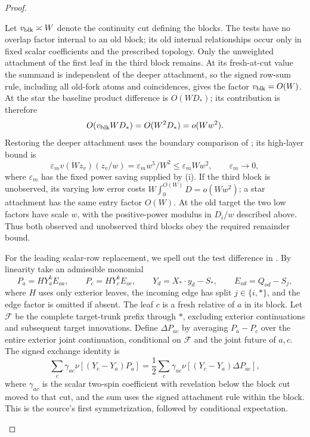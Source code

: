 \begin{proof}
\begin{enumerate}[label=(\roman*)]
Let \(v_{\rm blk}\asymp W\) denote the continuity cut defining the
blocks. The tests have no overlap factor internal to an old block;
its old internal relationships occur only in fixed scalar coefficients
and the prescribed topology.
Only the unweighted attachment of the first leaf in the third
block remains. At its fresh-at-cut value the summand is independent of
the deeper attachment, so the signed row-sum rule, including all old-fork atoms and coincidences,
gives the factor
\(v_{\rm blk}=O(W)\). At the star the baseline product difference
is \(O(WD_*)\); its contribution is therefore
\[
 O(v_{\rm blk}WD_*)=O(W^2D_*)=o(Ww^2).
\]
Restoring the deeper attachment uses the boundary comparison of
\cite[Lemma~4.5]{PE}; its high-layer bound is
\[
 \varepsilon_m v(Wz_v)(z_v/w)
 =\varepsilon_m w^5/W^2\le\varepsilon_m Ww^2,
 \qquad \varepsilon_m\to0,
\]
where \(\varepsilon_m\) has the fixed power saving supplied by (i). If the third block is unobserved,
its varying low error costs \(W\int_0^{O(W)}D=o(Ww^2)\);
a star attachment has the same entry factor \(O(W)\).
At the old target the two low factors have scale \(w\), with the
positive-power modulus in \(D_i/w\) described above. Thus both
observed and unobserved third blocks obey the required remainder bound.


For the leading scalar-row replacement, we spell out the test
difference in \cite[Lemma~4.8, proof of the first replacement]{PE}.
By linearity take an admissible monomial
\[
 P_a=H Y_a^k E_{oa},\qquad P_c=H Y_c^k E_{oc},\qquad
 Y_d=X_*\cdot y_d-S_*,\qquad E_{od}=Q_{od}-S_j,
\]
where \(H\) uses only exterior leaves, the incoming edge has split
\(j\in\{i,*\}\), and the edge factor is omitted if absent.
The leaf \(c\) is a fresh relative of \(a\) in its block.
Let \(\mathcal F\) be the complete target-trunk prefix through
\(*\), excluding exterior continuations and subsequent target
innovations. Define \(\Delta P_{ac}\) by averaging \(P_a-P_c\)
over the entire exterior joint continuation, conditional on
\(\mathcal F\) and the joint future of \(a,c\).
The signed exchange identity is
\[
 \sum_c\gamma_{ac}\nu[(Y_c-Y_a)P_a]
 =\frac12\sum_c\gamma_{ac}\nu[(Y_c-Y_a)\Delta P_{ac}],
\]
where \(\gamma_{ac}\) is the scalar two-spin coefficient with
revelation below the block cut moved to that cut, and the sum uses the
signed attachment rule within the block. This is the source's first
symmetrization, followed by conditional expectation.


\end{enumerate}
\end{proof}
